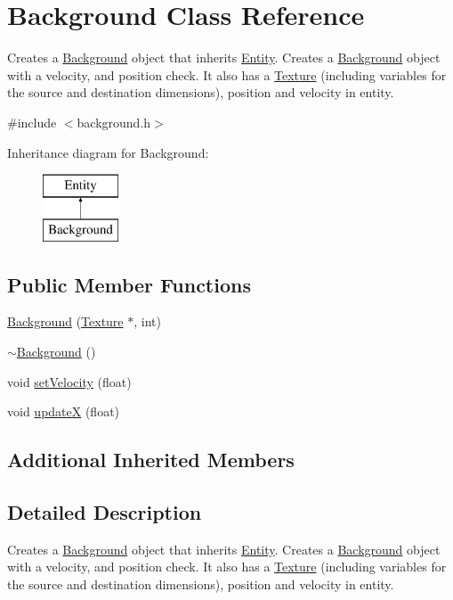 \hypertarget{class_background}{\section{Background Class Reference}
\label{class_background}
}


Creates a \hyperlink{class_background}{Background} object that inherits \hyperlink{class_entity}{Entity}. Creates a \hyperlink{class_background}{Background} object with a velocity, and position check. It also has a \hyperlink{class_texture}{Texture} (including variables for the source and destination dimensions), position and velocity in entity.  




{\ttfamily \#include $<$background.\+h$>$}

Inheritance diagram for Background\+:\begin{figure}[H]
\begin{center}
\leavevmode
\includegraphics[height=2.000000cm]{class_background}
\end{center}
\end{figure}
\subsection*{Public Member Functions}
\begin{DoxyCompactItemize}
\item 
\hyperlink{class_background_a31d67c19cf5dd14c0f07b91e89c8b1f8}{Background} (\hyperlink{class_texture}{Texture} $\ast$, int)
\item 
\hyperlink{class_background_a36754df1deb720393217ade59da41557}{$\sim$\+Background} ()
\item 
void \hyperlink{class_background_a9b358e049be63be31b9241410288514f}{set\+Velocity} (float)
\item 
void \hyperlink{class_background_a1cb5afc5d8857ec4db6c6d393375a4c2}{update\+X} (float)
\end{DoxyCompactItemize}
\subsection*{Additional Inherited Members}


\subsection{Detailed Description}
Creates a \hyperlink{class_background}{Background} object that inherits \hyperlink{class_entity}{Entity}. Creates a \hyperlink{class_background}{Background} object with a velocity, and position check. It also has a \hyperlink{class_texture}{Texture} (including variables for the source and destination dimensions), position and velocity in entity. 


